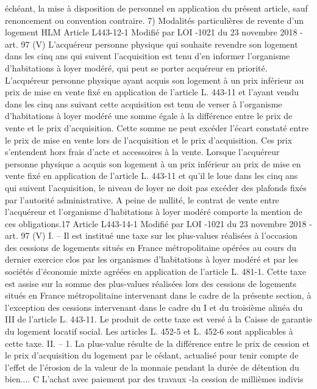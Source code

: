 \documentclass[11pt,a4paper]{report}
\begin{document}
	échéant, la mise à disposition de personnel en application du présent article, sauf renoncement ou convention
	contraire.
	7) Modalités particulières de revente d’un logement HLM
	Article L443-12-1 Modifié par LOI -1021 du 23 novembre 2018 - art. 97 (V)
	L'acquéreur personne physique qui souhaite revendre son logement dans les cinq ans qui suivent l'acquisition
	est tenu d'en informer l'organisme d'habitations à loyer modéré, qui peut se porter acquéreur en priorité.
	L'acquéreur personne physique ayant acquis son logement à un prix inférieur au prix de mise en vente fixé en
	application de l'article L. 443-11 et l'ayant vendu dans les cinq ans suivant cette acquisition est tenu de verser à
	l'organisme d'habitations à loyer modéré une somme égale à la différence entre le prix de vente et le prix
	d'acquisition. Cette somme ne peut excéder l'écart constaté entre le prix de mise en vente lors de l'acquisition et
	le prix d'acquisition.
	Ces prix s'entendent hors frais d'acte et accessoires à la vente.
	Lorsque l'acquéreur personne physique a acquis son logement à un prix inférieur au prix de mise en vente fixé
	en application de l'article L. 443-11 et qu'il le loue dans les cinq ans qui suivent l'acquisition, le niveau de loyer
	ne doit pas excéder des plafonds fixés par l'autorité administrative.
	A peine de nullité, le contrat de vente entre l'acquéreur et l'organisme d'habitations à loyer modéré comporte la
	mention de ces obligations.17
	Article L443-14-1 Modifié par LOI -1021 du 23 novembre 2018 - art. 97 (V)
	I. – Il est institué une taxe sur les plus-values réalisées à l'occasion des cessions de logements situés en France
	métropolitaine opérées au cours du dernier exercice clos par les organismes d'habitations à loyer modéré et par
	les sociétés d'économie mixte agréées en application de l'article L. 481-1.
	Cette taxe est assise sur la somme des plus-values réalisées lors des cessions de logements situés en France
	métropolitaine intervenant dans le cadre de la présente section, à l'exception des cessions intervenant dans le
	cadre du I et du troisième alinéa du III de l'article L. 443-11. Le produit de cette taxe est versé à la Caisse de
	garantie du logement locatif social. Les articles L. 452-5 et L. 452-6 sont applicables à cette taxe.
	II. – 1. La plus-value résulte de la différence entre le prix de cession et le prix d'acquisition du logement par le
	cédant, actualisé pour tenir compte de l'effet de l'érosion de la valeur de la monnaie pendant la durée de
	détention du bien....
	C L’achat avec paiement par des travaux
	-la cession de millièmes indivis
\end{document}
